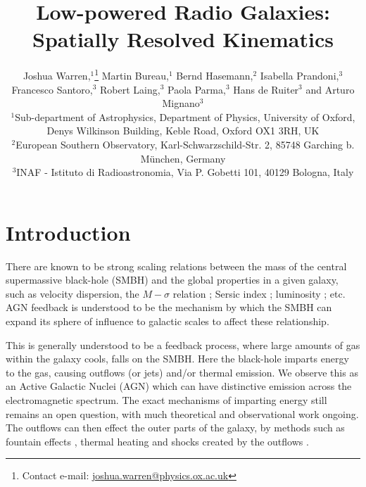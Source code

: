 \documentclass[fleqn,usenatbib,useAMS]{mnras}
\title{Low-powered Radio Galaxies: Spatially Resolved Kinematics}
\author[J. Warren et al.]{
Joshua Warren,$^{1}$\thanks{Contact e-mail: \href{mailto:joshua.warren@physics.ox.ac.uk}{joshua.warren@physics.ox.ac.uk}}
Martin Bureau,$^{1}$
Bernd Hasemann,$^{2}$
Isabella Prandoni,$^{3}$ \newauthor
Francesco Santoro,$^{3}$
Robert Laing,$^{3}$
Paola Parma,$^{3}$
Hans de Ruiter$^{3}$
and Arturo Mignano$^{3}$
\\
$^{1}$Sub-department of Astrophysics, Department of Physics, University of Oxford, Denys Wilkinson Building, Keble Road, Oxford OX1 3RH, UK\\
$^{2}$European Southern Observatory, Karl-Schwarzschild-Str. 2, 85748 Garching b. München, Germany\\
$^{3}$INAF - Istituto di Radioastronomia, Via P. Gobetti 101, 40129 Bologna, Italy}
\begin{document}
\maketitle


\begin{abstract}

\end{abstract}



\section{Introduction}
	\label{sec:intro}
	There are known to be strong scaling relations between the mass of the central supermassive black-hole (SMBH) and the global properties in a given galaxy, such as velocity dispersion, the $M-\sigma$ relation \citep{Ferrarese2000, Gebhardt2000, Graham2011}; Sersic index \citep{Graham2007, Savorgnan2013}; luminosity \citep{Laor2001, McLure2001, Lauer2007, Graham2012}; etc. AGN feedback is understood to be the mechanism by which the SMBH can expand its sphere of influence to galactic scales to affect these relationship. 

	This is generally understood to be a feedback process, where large amounts of gas within the galaxy cools, falls on the SMBH. Here the black-hole imparts energy to the gas, causing outflows (or jets) and/or thermal emission. We observe this as an Active Galactic Nuclei (AGN) which can have distinctive emission across the electromagnetic spectrum. The exact mechanisms of imparting energy still remains an open question, with much theoretical and observational work ongoing. The outflows can then effect the outer parts of the galaxy, by methods such as fountain effects \citep{}, thermal heating \citep{DeYoung2010} and shocks created by the outflows \citep{}.
\end{document}
